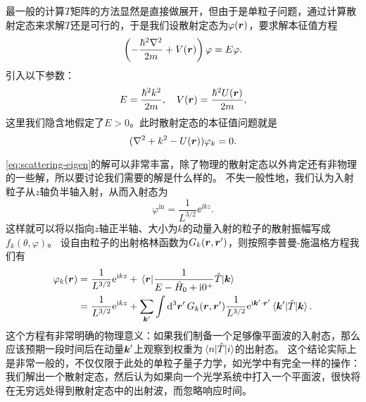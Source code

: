 最一般的计算$T$矩阵的方法显然是直接做展开，但由于是单粒子问题，通过计算散射定态来求解$T$还是可行的，于是我们设散射定态为$\varphi(\vb*{r})$，要求解本征值方程
\[
    \left( - \frac{\hbar^2 \laplacian}{2m} + V(\vb*{r}) \right) \varphi = E \varphi.
\]
引入以下参数：
\begin{equation}
    E = \frac{\hbar^2 k^2}{2m}, \quad V(\vb*{r}) = \frac{\hbar^2 U(\vb*{r})}{2m},
\end{equation}
这里我们隐含地假定了$E>0$。此时散射定态的本征值问题就是
\begin{equation}
    (\laplacian + k^2 - U(\vb*{r})) \varphi_k = 0.
    \label{eq:scattering-eigen}
\end{equation}

\eqref{eq:scattering-eigen}的解可以非常丰富，除了物理的散射定态以外肯定还有非物理的一些解，所以要讨论我们需要的解是什么样的。
不失一般性地，我们认为入射粒子从$z$轴负半轴入射，从而入射态为
\[
    \varphi^\text{in} = \frac{1}{L^{3/2}} \ee^{\ii k z}.
\]
这样就可以将以指向$z$轴正半轴、大小为$k$的动量入射的粒子的散射振幅写成$f_k(\theta, \varphi)$。
设自由粒子的出射格林函数为$G_k(\vb*{r}, \vb*{r}')$，则按照李普曼-施温格方程我们有
\[
    \begin{aligned}
        \varphi_k(\vb*{r}) &= \frac{1}{L^{3/2}} \mathrm{e}^{\mathrm{i} k z} + \mel{\vb*{r}}{\frac{1}{E - \hat{H}_0 + \mathrm{i}0^+} \hat{T}}{\vb*{k}} \\
        &= \frac{1}{L^{3/2}} \mathrm{e}^{\mathrm{i} k z} + \sum_{\vb*{k}'} \int \dd[3]{\vb*{r}'} G_k(\vb*{r}, \vb*{r}') \frac{1}{L^{3/2}} \mathrm{e}^{\mathrm{i} \vb*{k}' \cdot \vb*{r}'} \mel*{\vb*{k}'}{\hat{T}}{\vb*{k}}.
    \end{aligned}
\]
这个方程有非常明确的物理意义：如果我们制备一个足够像平面波的入射态，那么应该预期一段时间后在动量$\vb*{k}'$上观察到权重为$\mel{n}{\hat{T}}{i}$的出射态。
这个结论实际上是非常一般的，不仅仅限于此处的单粒子量子力学，如光学中有完全一样的操作：我们解出一个散射定态，然后认为如果向一个光学系统中打入一个平面波，很快将在无穷远处得到散射定态中的出射波，而忽略响应时间。

